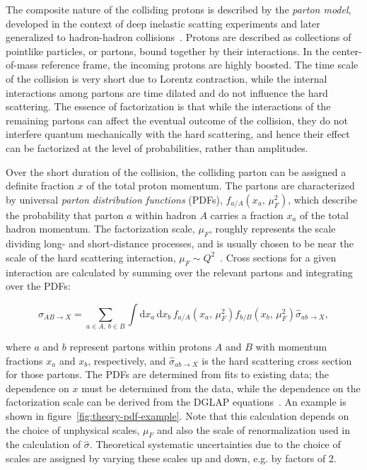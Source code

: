 The composite nature of the colliding protons is described by the \emph{parton model}, developed in the context of deep inelastic scatting experiments and later generalized to hadron-hadron collisions~\cite{Bjorken:1969ja,feynmanparton,Drell:1970yt}. Protons are described as collections of pointlike particles, or partons, bound together by their interactions. In the center-of-mass reference frame, the incoming protons are highly boosted. The time scale of the collision is very short due to Lorentz contraction, while the internal interactions among partons are time dilated and do not influence the hard scattering. The essence of factorization is that while the interactions of the remaining partons can affect the eventual outcome of the collision, they do not interfere quantum mechanically with the hard scattering, and hence their effect can be factorized at the level of probabilities, rather than amplitudes.

Over the short duration of the collision, the colliding parton can be assigned a definite fraction $x$ of the total proton momentum. The partons are characterized by universal \emph{parton distribution functions} (PDFs), $f_{a/A}(x_a,\,\mu_F^2)$, which describe the probability that parton $a$ within hadron $A$ carries a fraction $x_a$ of the total hadron momentum. The factorization scale, $\mu_F$, roughly represents the scale dividing long- and short-distance processes, and is usually chosen to be near the scale of the hard scattering interaction, $\mu_F\sim Q^2$~\cite{Campbell:2006jf}. Cross sections for a given interaction are calculated by summing over the relevant partons and integrating over the PDFs:

\begin{equation}
	\sigma_{AB\rightarrow X} = \sum_{a\in A,\,b\in B}\int \mathrm{d}x_a\, \mathrm{d}x_b\, f_{a/A}(x_a,\,\mu_F^2) f_{b/B}(x_b,\,\mu_F^2) \hat{\sigma}_{ab\rightarrow X},
\end{equation}

where $a$ and $b$ represent partons within protons $A$ and $B$ with momentum fractions $x_a$ and $x_b$, respectively, and $\hat{\sigma}_{ab\rightarrow X}$ is the hard scattering cross section for those partons. The PDFs are determined from fits to existing data; the dependence on $x$ must be determined from the data, while the dependence on the factorization scale can be derived from the DGLAP equations~\cite{Gribov:1972ri,Dokshitzer:1977sg,Altarelli:1977zs}. An example is shown in figure~\ref{fig:theory-pdf-example}. Note that this calculation depends on the choice of unphysical scales, $\mu_F$ and also the scale of renormalization used in the calculation of $\hat{\sigma}$. Theoretical systematic uncertainties due to the choice of scales are assigned by varying these scales up and down, e.g. by factors of 2. 

